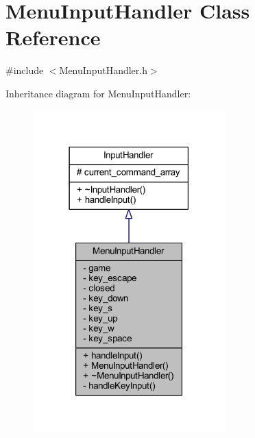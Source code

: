 \hypertarget{class_menu_input_handler}{}\section{Menu\+Input\+Handler Class Reference}
\label{class_menu_input_handler}


{\ttfamily \#include $<$Menu\+Input\+Handler.\+h$>$}



Inheritance diagram for Menu\+Input\+Handler\+:
\nopagebreak
\begin{figure}[H]
\begin{center}
\leavevmode
\includegraphics[width=210pt]{class_menu_input_handler__inherit__graph}
\end{center}
\end{figure}


